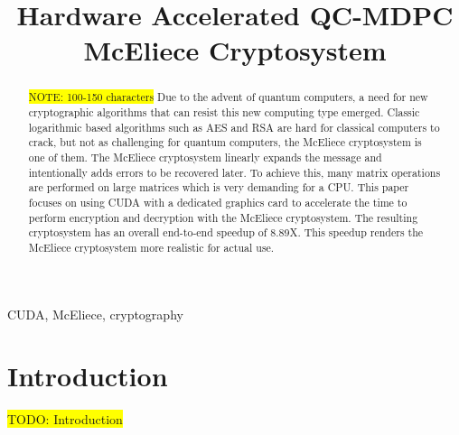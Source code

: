 \documentclass[conference]{IEEEtran}
\begin{document}
\title{Hardware Accelerated QC-MDPC McEliece Cryptosystem\\
}

\author{
\and
{}
\and
{}
}

\maketitle

\begin{abstract}
    \colorbox{yellow}{NOTE: 100-150 characters}
    Due to the advent of quantum computers, a need for new cryptographic algorithms that can resist this new computing type emerged. Classic logarithmic based algorithms such as AES and RSA are hard for classical computers to crack, but not as challenging for quantum computers, the McEliece cryptosystem is one of them. The McEliece cryptosystem linearly expands the message and intentionally adds errors to be recovered later. To achieve this, many matrix operations are performed on large matrices which is very demanding for a CPU. This paper focuses on using CUDA with a dedicated graphics card to accelerate the time to perform encryption and decryption with the McEliece cryptosystem. The resulting cryptosystem has an overall end-to-end speedup of 8.89X. This speedup renders the McEliece cryptosystem more realistic for actual use.
\end{abstract}

\begin{IEEEkeywords}
    CUDA, McEliece, cryptography
\end{IEEEkeywords}

\section{Introduction}\label{Introduction}
    \colorbox{yellow}{TODO: Introduction}
    
\end{document}
